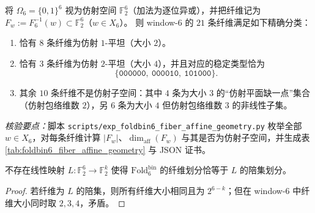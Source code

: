 \begin{enumerate}
  \begin{theorem}\label{thm:terminal-foldbin6-fiber-affine-geometry}
  将 \(\Omega_6=\{0,1\}^6\) 视为仿射空间 \(\mathbb{F}_2^6\)（加法为逐位异或），并把纤维记为
  \(F_w:=F_6^{-1}(w)\subset \mathbb{F}_2^6\)（\(w\in X_6\)）。
  则 window-\(6\) 的 \(21\) 条纤维满足如下精确分类：
  \begin{enumerate}
    \item 恰有 \(8\) 条纤维为仿射 \(1\)-平坦（大小 \(2\)）。
    \item 恰有 \(3\) 条纤维为仿射 \(2\)-平坦（大小 \(4\)），并且对应的稳定类型恰为
    \[
    \{\texttt{000000},\ \texttt{000010},\ \texttt{101000}\}.
    \]
    \item 其余 \(10\) 条纤维不是仿射子空间：其中 \(4\) 条为大小 \(3\) 的“仿射平面缺一点”集合（仿射包络维数 \(2\)），另 \(6\) 条为大小 \(4\) 但仿射包络维数 \(3\) 的非线性子集。
  \end{enumerate}
  \emph{核验要点：}脚本 \texttt{scripts/exp\_foldbin6\_fiber\_affine\_geometry.py} 枚举全部 \(w\in X_6\)，对每条纤维计算 \(|F_w|\)、\(\dim_{\mathrm{aff}}(F_w)\) 与其是否为仿射子空间，并生成表 \ref{tab:foldbin6_fiber_affine_geometry} 与 JSON 证书。
  \end{theorem}
  

  \begin{corollary}\label{cor:terminal-foldbin6-no-linear-kernel}
  不存在线性映射 \(L:\mathbb{F}_2^6\to \mathbb{F}_2^k\) 使得 \(\mathrm{Fold}^{\mathrm{bin}}_6\) 的纤维划分恰等于 \(L\) 的陪集划分。
  \begin{proof}
  若纤维为 \(L\) 的陪集，则所有纤维大小相同且为 \(2^{6-k}\)；但在 window-\(6\) 中纤维大小同时取 \(2,3,4\)，矛盾。
  \end{proof}
  \end{corollary}


\end{enumerate}
